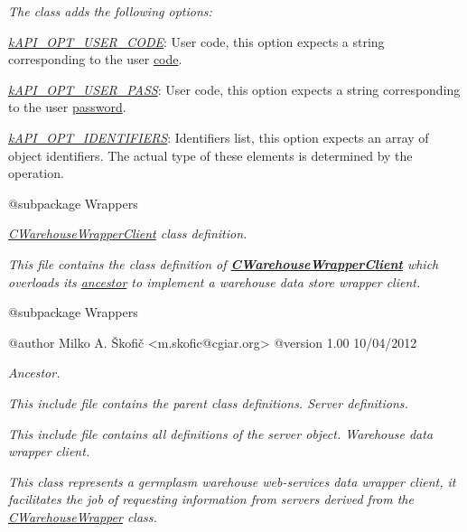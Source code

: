 {\itshape The class adds the following options\-:}

{\itshape 
\begin{DoxyItemize}
\item {\itshape \hyperlink{}{k\-A\-P\-I\-\_\-\-O\-P\-T\-\_\-\-U\-S\-E\-R\-\_\-\-C\-O\-D\-E}}\-: User code, this option expects a string corresponding to the user \hyperlink{class_c_coded_unit_object_a56af949800e65f9a283239d2e455259f}{code}. 
\item {\itshape \hyperlink{}{k\-A\-P\-I\-\_\-\-O\-P\-T\-\_\-\-U\-S\-E\-R\-\_\-\-P\-A\-S\-S}}\-: User code, this option expects a string corresponding to the user \hyperlink{class_c_user_a0e6f1cf51ad23f971ed0999f8d248c8d}{password}. 
\item {\itshape \hyperlink{}{k\-A\-P\-I\-\_\-\-O\-P\-T\-\_\-\-I\-D\-E\-N\-T\-I\-F\-I\-E\-R\-S}}\-: Identifiers list, this option expects an array of object identifiers. The actual type of these elements is determined by the operation. 
\end{DoxyItemize}}

{\itshape \begin{DoxyVerb} @subpackage        Wrappers\end{DoxyVerb}
}

{\itshape {\itshape \hyperlink{class_c_warehouse_wrapper_client}{C\-Warehouse\-Wrapper\-Client}} class definition.}

{\itshape This file contains the class definition of {\bfseries \hyperlink{class_c_warehouse_wrapper_client}{C\-Warehouse\-Wrapper\-Client}} which overloads its \hyperlink{class_c_mongo_data_wrapper_client}{ancestor} to implement a warehouse data store wrapper client.}

{\itshape \begin{DoxyVerb} @subpackage        Wrappers

 @author            Milko A. Škofič <m.skofic@cgiar.org>
 @version   1.00 10/04/2012\end{DoxyVerb}
}

{\itshape Ancestor.}

{\itshape This include file contains the parent class definitions. Server definitions.}

{\itshape This include file contains all definitions of the server object. Warehouse data wrapper client.}

{\itshape This class represents a germplasm warehouse web-\/services data wrapper client, it facilitates the job of requesting information from servers derived from the \hyperlink{class_c_warehouse_wrapper}{C\-Warehouse\-Wrapper} class.}

